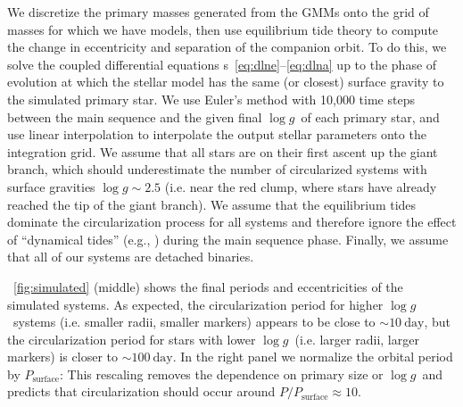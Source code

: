 \documentclass[modern, letterpaper]{aastex62}
\newcommand{\logg}{\ensuremath{\log g}}
\newcommand{\Psurf}{\ensuremath{P_\textrm{surface}}}
\begin{document}
We discretize the primary masses generated from the GMMs onto the grid of masses
for which we have  models, then use equilibrium tide theory to
compute the change in eccentricity and separation of the companion orbit.
To do this, we solve the coupled differential equations \eqname
s~\ref{eq:dlne}--\ref{eq:dlna} up to the phase of evolution at which the stellar
model has the same (or closest) surface gravity to the simulated primary star.
We use Euler's method with 10,000 time steps between the main sequence and the
given final \logg\ of each primary star, and use linear interpolation to
interpolate the  output stellar parameters onto the integration
grid.
We assume that all stars are on their first ascent up the giant branch, which
should underestimate the number of circularized systems with surface gravities
$\logg \sim 2.5$ (i.e. near the red clump, where stars have already reached the
tip of the giant branch).
We assume that the equilibrium tides dominate the circularization process for
all systems and therefore ignore the effect of ``dynamical tides''
(e.g., \citealt{Goodman:1998}) during the main sequence phase.
Finally, we assume that all of our systems are detached binaries.

\figurename~\ref{fig:simulated} (middle) shows the final periods and
eccentricities of the simulated systems.
As expected, the circularization period for higher \logg\ systems (i.e. smaller
radii, smaller markers) appears to be close to $\sim 10~\textrm{day}$, but the
circularization period for stars with lower \logg\ (i.e. larger radii, larger
markers) is closer to $\sim 100~\textrm{day}$.
In the right panel we normalize the orbital period by \Psurf:
This rescaling removes the dependence on primary size or \logg\ and predicts
that circularization should occur around $P / \Psurf \approx 10$.
\end{document}
